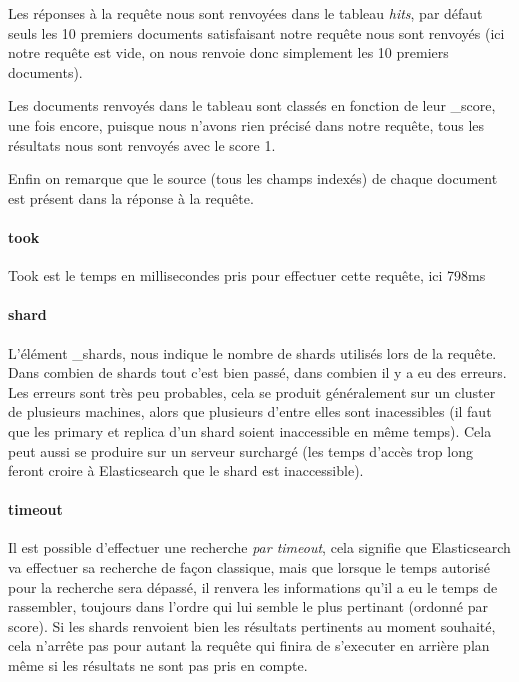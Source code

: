 {Les réponses à la requête nous sont renvoyées dans le tableau \textit{hits}, 
par défaut seuls les 10 premiers documents satisfaisant notre requête nous sont renvoyés 
(ici notre requête est vide, on nous renvoie donc simplement les 10 premiers documents).

Les documents renvoyés dans le tableau sont classés en fonction de leur \_score, une 
fois encore, puisque nous n'avons rien précisé dans notre requête, tous les résultats 
nous sont renvoyés avec le score 1.


Enfin on remarque que le source (tous les champs indexés) de chaque document est présent
dans la réponse à la requête.

\paragraph{took}
Took est le temps en millisecondes pris pour effectuer cette requête, ici 798ms

\paragraph{shard}
L'élément \_shards, nous indique le nombre de shards utilisés lors de la requête. 
Dans combien de shards tout c'est bien passé, dans combien il y a eu des erreurs.
Les erreurs sont très peu probables, cela se produit généralement sur un cluster 
de plusieurs machines, alors que plusieurs d'entre elles sont inacessibles (il faut 
que les primary et replica d'un shard soient inaccessible en même temps). Cela peut 
aussi se produire sur un serveur surchargé (les temps d'accès trop long feront croire 
à Elasticsearch que le shard est inaccessible).

\paragraph{timeout}
Il est possible d'effectuer une recherche \textit{par timeout}, cela signifie que 
Elasticsearch va effectuer sa recherche de façon classique, mais que lorsque le temps
autorisé pour la recherche sera dépassé, il renvera les informations 
qu'il a eu le temps de rassembler, toujours dans l'ordre qui lui semble le plus pertinant
(ordonné par score). Si les shards renvoient bien les résultats pertinents au moment
souhaité, cela n'arrête pas pour autant la requête qui finira de s'executer en arrière
plan même si les résultats ne sont pas pris en compte.

}
